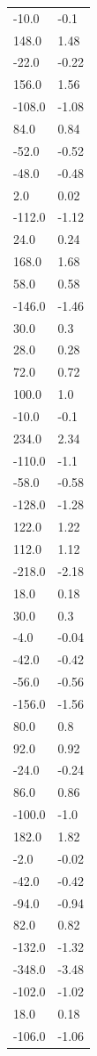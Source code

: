 \begin{longtable}{ll}
-10.0 & -0.1 \\
148.0 & 1.48 \\
-22.0 & -0.22 \\
156.0 & 1.56 \\
-108.0 & -1.08 \\
84.0 & 0.84 \\
-52.0 & -0.52 \\
-48.0 & -0.48 \\
2.0 & 0.02 \\
-112.0 & -1.12 \\
24.0 & 0.24 \\
168.0 & 1.68 \\
58.0 & 0.58 \\
-146.0 & -1.46 \\
30.0 & 0.3 \\
28.0 & 0.28 \\
72.0 & 0.72 \\
100.0 & 1.0 \\
-10.0 & -0.1 \\
234.0 & 2.34 \\
-110.0 & -1.1 \\
-58.0 & -0.58 \\
-128.0 & -1.28 \\
122.0 & 1.22 \\
112.0 & 1.12 \\
-218.0 & -2.18 \\
18.0 & 0.18 \\
30.0 & 0.3 \\
-4.0 & -0.04 \\
-42.0 & -0.42 \\
-56.0 & -0.56 \\
-156.0 & -1.56 \\
80.0 & 0.8 \\
92.0 & 0.92 \\
-24.0 & -0.24 \\
86.0 & 0.86 \\
-100.0 & -1.0 \\
182.0 & 1.82 \\
-2.0 & -0.02 \\
-42.0 & -0.42 \\
-94.0 & -0.94 \\
82.0 & 0.82 \\
-132.0 & -1.32 \\
-348.0 & -3.48 \\
-102.0 & -1.02 \\
18.0 & 0.18 \\
-106.0 & -1.06 \\

\end{longtable}
